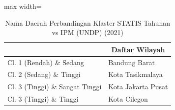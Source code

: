 \begin{table}[H]
\centering
\caption{Nama Daerah Perbandingan Klaster STATIS Tahunan vs IPM (UNDP) (2021)} \label{tab:sample2statis_ipm_name_2021}
\begin{adjustbox}{max width=\textwidth}
\begin{tabular}{|>{\centering\arraybackslash}p{4cm}|p{10cm}|}
\hline
\multicolumn{1}{|c|}{\textbf{Kategori}} & \multicolumn{1}{c|}{\textbf{Daftar Wilayah}} \\
\hline
Cl. 1 (Rendah) \& Sedang & Bandung Barat \\
\hline
Cl. 2 (Sedang) \& Tinggi & Kota Tasikmalaya \\
\hline
Cl. 3 (Tinggi) \& Sangat Tinggi & Kota Jakarta Pusat \\
\hline
Cl. 3 (Tinggi) \& Tinggi & Kota Cilegon \\
\hline
\end{tabular}
\end{adjustbox}
\end{table}